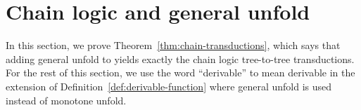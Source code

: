 \section{Chain logic and general unfold}
\label{sec:appendix-chain}
In this section, we prove Theorem~\ref{thm:chain-transductions}, which says that adding general unfold to \mso yields exactly the chain logic tree-to-tree transductions. For the rest of this section, we use the word ``derivable'' to mean derivable in the extension of Definition~\ref{def:derivable-function} where general unfold is used instead of monotone unfold. 